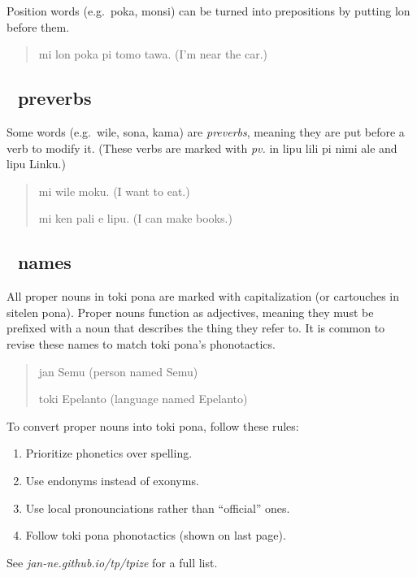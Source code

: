 \documentclass[statementpaper,oneside,article,14pt]{memoir}
\begin{document}
\noindent Position words (e.g.\ poka, monsi) can be turned into prepositions by putting lon before them.

\begin{quote}
  mi lon poka pi tomo tawa. (I'm near the car.)
\end{quote}

\subsection{{\sitpon󱥷} preverbs}

\noindent Some words (e.g.\ wile, sona, kama) are \textit{preverbs}, meaning they are put before a verb
to modify it. (These verbs are marked with \textit{pv.} in lipu lili pi nimi ale and lipu Linku.)

\begin{quote}
  mi wile moku. (I want to eat.)

  mi ken pali e lipu. (I can make books.)
\end{quote}

\subsection{{\sitpon󱤑} names}

\noindent All proper nouns in toki pona are marked with capitalization (or cartouches in sitelen pona).
Proper nouns function as adjectives, meaning they must be prefixed with a noun that describes 
the thing they refer to. It is common to revise these names to match toki pona's phonotactics.

\begin{quote}
  jan Semu (person named Semu)

  toki Epelanto (language named Epelanto)
\end{quote}

To convert proper nouns into toki pona, follow these rules:

\begin{enumerate}[itemsep=-5pt]
\item Prioritize phonetics over spelling.
\item Use endonyms instead of exonyms.
\item Use local pronounciations rather than ``official'' ones.
\item Follow toki pona phonotactics (shown on last page).
\end{enumerate}

\noindent See \textit{jan-ne.github.io/tp/tpize} for a full list.
\end{document}
